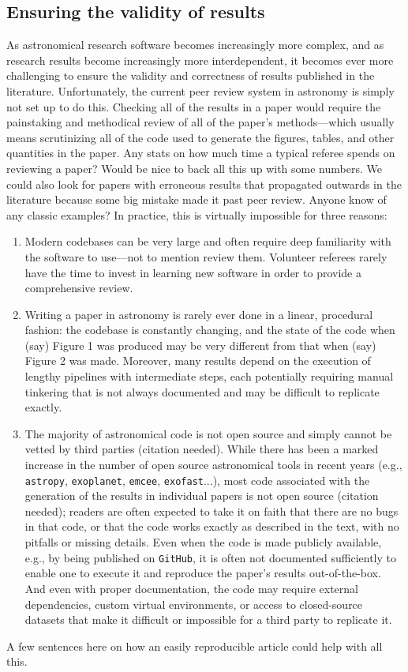 \documentclass{aastex631}
\newcommand\xxx[1]{{\color{red}#1}}
\newcommand\needscite{{\color{red}(citation needed)}}
\begin{document}
\subsection{Ensuring the validity of results}
\label{sec:args:validity}
As astronomical research software becomes increasingly more complex, and as research results become increasingly more interdependent, it becomes ever more challenging to ensure the validity and correctness of results published in the literature. 
Unfortunately, the current peer review system in astronomy is simply not set up to do this.
Checking all of the results in a paper would require the painstaking and methodical review of all of the paper's methods---which usually means scrutinizing all of the code used to generate the figures, tables, and other quantities in the paper. 
%
\xxx{Any stats on how much time a typical referee spends on reviewing a paper? Would be nice to back all this up with some numbers.}
%
\xxx{We could also look for papers with erroneous results that propagated outwards in the literature because some big mistake made it past peer review. Anyone know of any classic examples?}
%
In practice, this is virtually impossible for three reasons:
%
\begin{enumerate}
    \item Modern codebases can be very large and often require deep familiarity with the software to use---not to mention review them. Volunteer referees rarely have the time to invest in learning new software in order to provide a comprehensive review.
    \item  Writing a paper in astronomy is rarely ever done in a linear, procedural fashion: the codebase is constantly changing, and the state of the code when (say) Figure 1 was produced may be very different from that when (say) Figure 2 was made. 
    Moreover, many results depend on the execution of lengthy pipelines with intermediate steps, each potentially requiring manual tinkering that is not always documented and may be difficult to replicate exactly.
    \item The majority of astronomical code is not open source and simply cannot be vetted by third parties \needscite. 
    While there has been a marked increase in the number of open source astronomical tools in recent years (e.g., \texttt{astropy}, \texttt{exoplanet}, \texttt{emcee}, \texttt{exofast}...), most code associated with the generation of the results in individual papers is not open source \needscite; readers are often expected to take it on faith that there are no bugs in that code, or that the code works exactly as described in the text, with no pitfalls or missing details. 
    Even when the code is made publicly available, e.g., by being published on \texttt{GitHub}, it is often not documented sufficiently to enable one to execute it and reproduce the paper's results out-of-the-box. 
    And even with proper documentation, the code may require external dependencies, custom virtual environments, or access to closed-source datasets that make it difficult or impossible for a third party to replicate it.
\end{enumerate}
%
\xxx{A few sentences here on how an easily reproducible article could help with all this.}
\end{document}
